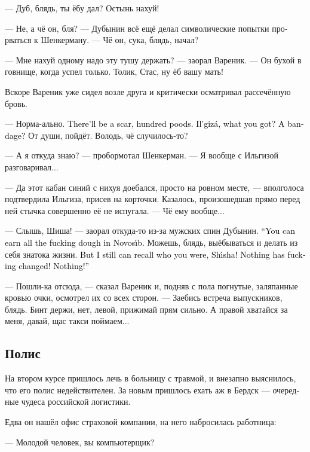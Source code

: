 \documentclass[a5paper,12pt,fleqn]{extbook}\usepackage{cooltooltips}\usepackage{polyglossia}\setdefaultlanguage[babelshorthands=true]{russian}\setotherlanguage{english}\defaultfontfeatures{Ligatures=TeX,Mapping=tex-text} \usepackage{xcolor}\definecolor{lightgray}{HTML}{bbbbbb}\color{lightgray}\newcommand{\ml}[3]{\textenglish{\textcolor{black}{#3}}}
\newcommand{\Ilgiza}{Il'giz\'a}
\begin{document}
--- Дуб, блядь, ты ёбу дал?
Остынь нахуй!

--- Не, а чё он, бля? --- Дубынин всё ещё делал символические попытки прорваться к Шенкерману.
--- Чё он, сука, блядь, начал?

--- Мне нахуй одному надо эту тушу держать? --- заорал Вареник.
--- Он бухой в говнище, когда успел только.
Толик, Стас, ну ёб вашу мать!

Вскоре Вареник уже сидел возле друга и критически осматривал рассечённую бровь.

--- Норма-ально.
\ml{$0$}
{Шрам останется, сто пудов.}
{There'll be a scar, hundred poods.}
\ml{$0$}
{Ильгиза, чё там у тебя?}
{\Ilgiza, what you got?}
\ml{$0$}
{Бинт?}
{A bandage?}
От души, пойдёт.
Володь, чё случилось-то?

--- А я откуда знаю? --- пробормотал Шенкерман.
--- Я вообще с Ильгизой разговаривал...

--- Да этот кабан синий с нихуя доебался, просто на ровном месте, --- вполголоса подтвердила Ильгиза, присев на корточки.
Казалось, произошедшая прямо перед ней стычка совершенно её не испугала.
--- Чё ему вообще...

--- Слышь, Шиша! --- заорал откуда-то из-за мужских спин Дубынин.
\ml{$0$}
{--- Ты, блядь, можешь хоть все лавэ в Новосибе заработать.}
{``You can earn all the fucking dough in Novos\'{\i}b.}
Можешь, блядь, выёбываться и делать из себя знатока жизни.
\ml{$0$}
{Я помню, каким ты был, Шиша, помню!}
{But I still can recall who you were, Sh\'{\i}sha!}
\ml{$0$}
{Нихуя не изменилось!}
{Nothing has fucking changed!}
\ml{$0$}
{Нихуя!}
{Nothing!''}

--- Пошли-ка отсюда, --- сказал Вареник и, подняв с пола погнутые, заляпанные кровью очки, осмотрел их со всех сторон.
--- Заебись встреча выпускников, блядь.
Бинт держи, нет, левой, прижимай прям сильно.
А правой хватайся за меня, давай, щас такси поймаем...

\subsection{Полис}

На втором курсе пришлось лечь в больницу с травмой, и внезапно выяснилось, что его полис недействителен.
За новым пришлось ехать аж в Бердск --- очередные чудеса российской логистики.

Едва он нашёл офис страховой компании, на него набросилась работница:

--- Молодой человек, вы компьютерщик?
\end{document}
